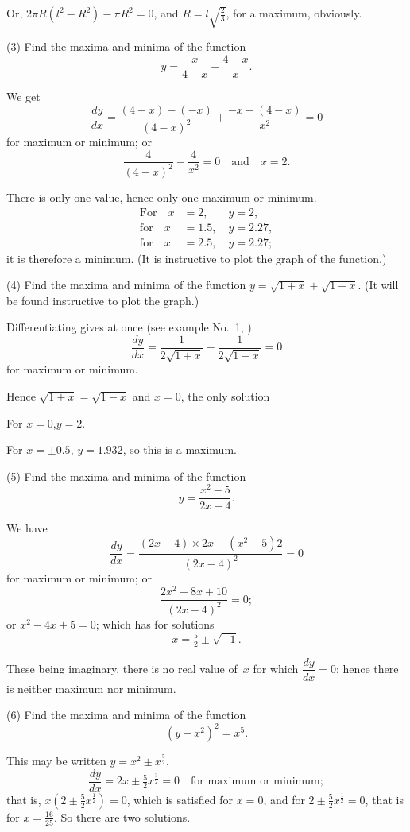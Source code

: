 \documentclass[12pt]{book}[2005/09/16]
\newcommand{\DPPageSep}[2]{\Pagelabel{#2}}
\newcommand{\Pagelabel}[1]
  {\phantomsection\label{#1}}
\newcommand{\Pageref}[2][p.]{%
  \ifthenelse{\not\equal{#1}{}}{%
    \hyperref[#2]{#1~\pageref*{#2}}%
  }{%
    \hyperref[#2]{\pageref{*#2}}%
  }%
}
\newcommand{\DPtypo}[2]{#2}%
\newcommand{\efrac}[2]{\frac{#1}{#2}}
\begin{document}
Or, $2\pi R(l^2 - R^2) - \pi R^2 = 0$, and $R = l\sqrt{\tfrac{2}{3}}$, for a maximum,
obviously.
\DPPageSep{118.png}{106}%

(3) Find the maxima and minima of the function
\[
y = \dfrac{x}{4-x} + \dfrac{4-x}{x}.
\]

We get
\[
\dfrac{dy}{dx} = \dfrac{(4-x)-(-x)}{(4-x)^2} + \dfrac{-x - (4-x)}{x^2} = 0
\]
for maximum or minimum; or
\[
\dfrac{4}{(4-x)^2} - \dfrac{4}{x^2} = 0 \quad\text{and}\quad x = 2.
\]

There is only one value, hence only one maximum
or minimum.
\begin{align*}
\text{For}\quad x &= 2,\phantom{.5}\quad y = 2, \\
\text{for}\quad x &= 1.5,\quad y = 2.27,   \\
\text{for}\quad x &= 2.5,\quad y = 2.27;
\end{align*}
it is therefore a minimum. (It is instructive to plot
the graph of the function.)

(4) Find the maxima and minima of the function
$y = \sqrt{1+x} + \sqrt{1-x}$. (It will be found instructive to
plot the graph.)

Differentiating gives at once (see example No.~1,
\Pageref{ExNo1})
\[
\dfrac{dy}{dx} = \dfrac{1}{2\sqrt{1+x}} - \dfrac{1}{2\sqrt{1-x}} = 0
\]
for maximum or minimum.

Hence $\sqrt{1+x} = \sqrt{1-x}$ and $x = 0$, the only solution

For $x=0$,\quad $y=2$.

For $x=±0.5$, $y= 1.932$, so this is a maximum.
\DPPageSep{119.png}{107}%

(5) Find the maxima and minima of the function
\[
y = \dfrac{x^2-5}{2x-4}.
\]

We have
\[
\dfrac{dy}{dx} = \dfrac{(2x-4) × 2x - (x^2-5)2}{(2x-4)^2} = 0
\]
for maximum or minimum; or
\[
\dfrac{2x^2 - 8x + 10}{\DPtypo{(2x - 5)^2}{(2x - 4)^2}} = 0;
\]
or $x^2 - 4x + 5 = 0$; which has for solutions
\[
x = \tfrac{5}{2} ± \sqrt{-1}.
\]

These being imaginary, there is no real value of~$x$
for which $\dfrac{dy}{dx} = 0$; hence there is neither maximum nor
minimum.

(6) Find the maxima and minima of the function
\[
(y-x^2)^2 = x^5.
\]

This may be written $y = x^2 ± x^{\efrac{5}{2}}$.
\[
\dfrac{dy}{dx} = 2x ± \tfrac{5}{2} x^{\efrac{3}{2}} = 0 \quad\text{for maximum or minimum};
\]
that is, $x(2 ± \tfrac{5}{2} x^{\efrac{1}{2}}) = 0$, which is satisfied for $x = 0$,
and for $2 ± \tfrac{5}{2} x^{\efrac{1}{2}} = 0$, that is for $x=\tfrac{16}{25}$. So there are
two solutions.
\end{document}
